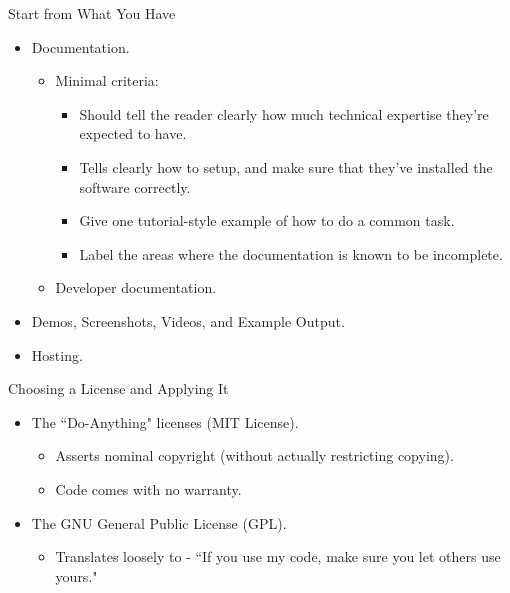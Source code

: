 \documentclass{beamer}
\begin{document}
\begin{frame}{Start from What You Have}
\begin{itemize}
	\item Documentation. \pause
	\begin{itemize}
		\item Minimal criteria: \pause
		\begin{itemize}
			\item Should tell the reader clearly how much technical expertise they're expected to have. \pause
			\item Tells clearly how to setup, and make sure that they've installed the software correctly. \pause
			\item Give one tutorial-style example of how to do a common task. \pause
			\item Label the areas where the documentation is known to be incomplete. \pause	
		\end{itemize}
		\item Developer documentation.	
	\end{itemize}
	\item Demos, Screenshots, Videos, and Example Output. \pause
	\item Hosting.
\end{itemize}
\end{frame}

\begin{frame}{Choosing a License and Applying It} \pause
\begin{itemize}
	\item The ``Do-Anything" licenses (MIT License). \pause
	\begin{itemize}
		\item Asserts nominal copyright (without actually restricting copying). \pause
		\item Code comes with no warranty. \pause
	\end{itemize}
	\item The GNU General Public License (GPL). \pause
	\begin{itemize}
		\item Translates loosely to - ``If you use my code, make sure you let others use yours."
	\end{itemize}
\end{itemize}
\end{frame}
\end{document}
